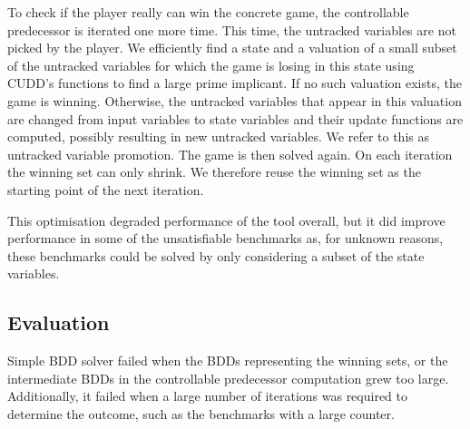 To check if the player really can win the concrete game, the controllable predecessor is iterated one more time. This time, the untracked variables are not picked by the player. We efficiently find a state and a valuation of a small subset of the untracked variables for which the game is losing in this state using CUDD's functions to find a large prime implicant. If no such valuation exists, the game is winning. Otherwise, the untracked variables that appear in this valuation are changed from input variables to state variables and their update functions are computed, possibly resulting in new untracked variables. We refer to this as untracked variable promotion. The game is then solved again. On each iteration the winning set can only shrink. We therefore reuse the winning set as the starting point of the next iteration.

This optimisation degraded performance of the tool overall, but it did improve performance in some of the unsatisfiable benchmarks as, for unknown reasons, these benchmarks could be solved by only considering a subset of the state variables.

\subsection{Evaluation}
Simple BDD solver failed when the BDDs representing the winning sets, or the intermediate BDDs in the controllable predecessor computation grew too large. Additionally, it failed when a large number of iterations was required to determine the outcome, such as the benchmarks with a large counter.

